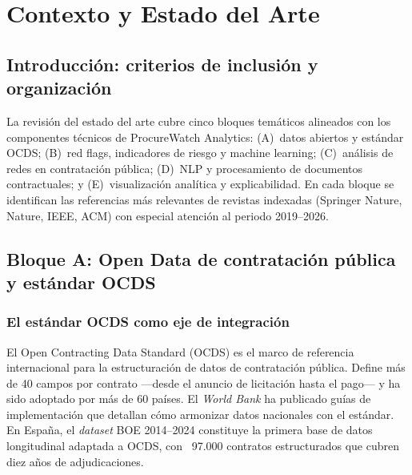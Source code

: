 \documentclass[11pt,a4paper,spanish]{book}
\numberwithin{equation}{chapter}
\numberwithin{figure}{chapter}
\begin{document}
\chapter{Contexto y Estado del Arte}

\section{Introducci{\'o}n: criterios de inclusi{\'o}n y organizaci{\'o}n}

La revisi{\'o}n del estado del arte cubre cinco bloques tem{\'a}ticos alineados con los componentes t{\'e}cnicos de ProcureWatch Analytics: (A)~datos abiertos y est{\'a}ndar OCDS; (B)~red flags, indicadores de riesgo y machine learning; (C)~an{\'a}lisis de redes en contrataci{\'o}n p{\'u}blica; (D)~NLP y procesamiento de documentos contractuales; y (E)~visualizaci{\'o}n anal{\'i}tica y explicabilidad. En cada bloque se identifican las referencias m{\'a}s relevantes de revistas indexadas (Springer Nature, Nature, IEEE, ACM) con especial atenci{\'o}n al periodo 2019--2026.

\section{Bloque A: Open Data de contrataci{\'o}n p{\'u}blica y est{\'a}ndar OCDS}

\subsection{El est{\'a}ndar OCDS como eje de integraci{\'o}n}

El Open Contracting Data Standard (OCDS) \cite{OCDS2024} es el marco de referencia internacional para la estructuraci{\'o}n de datos de contrataci{\'o}n p{\'u}blica. Define m{\'a}s de 40 campos por contrato ---desde el anuncio de licitaci{\'o}n hasta el pago--- y ha sido adoptado por m{\'a}s de 60 pa{\'i}ses. El \textit{World Bank} \cite{WorldBankOCDS2021} ha publicado gu{\'i}as de implementaci{\'o}n que detallan c{\'o}mo armonizar datos nacionales con el est{\'a}ndar. En Espa{\~n}a, el \textit{dataset} BOE 2014--2024 \cite{MunozPla2026} constituye la primera base de datos longitudinal adaptada a OCDS, con ~97.000 contratos estructurados que cubren diez a{\~n}os de adjudicaciones.
\end{document}
